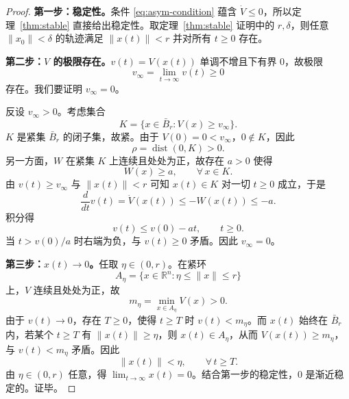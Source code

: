 \documentclass[11pt, a4paper, UTF8, fontset=none]{ctexart}
\theoremstyle{cnthm}
\newcommand{\R}{\mathbb{R}}
\newcommand{\norm}[1]{\lVert #1\rVert}
\DeclareMathOperator{\dist}{dist}
\begin{document}
\begin{proof}
\textbf{第一步：稳定性。}条件 \eqref{eq:asym-condition} 蕴含 $\dot V\le0$，所以定理~\ref{thm:stable} 直接给出稳定性。取定理~\ref{thm:stable} 证明中的 $r,\delta$，则任意 $\norm{x_0}<\delta$ 的轨迹满足 $\norm{x(t)}<r$ 并对所有 $t\ge0$ 存在。

\textbf{第二步：$V$ 的极限存在。}$v(t)=V(x(t))$ 单调不增且下有界 $0$，故极限
\begin{equation}
  v_\infty=\lim_{t\to\infty}v(t)\ge0
\end{equation}
存在。我们要证明 $v_\infty=0$。

反设 $v_\infty>0$。考虑集合
\begin{equation}
  K=\{x\in\bar B_r: V(x)\ge v_\infty\}.
\end{equation}
$K$ 是紧集 $\bar B_r$ 的闭子集，故紧。由于 $V(0)=0<v_\infty$，$0\notin K$，因此
\begin{equation}
  \rho=\dist(0,K)>0.
\end{equation}
另一方面，$W$ 在紧集 $K$ 上连续且处处为正，故存在 $a>0$ 使得
\begin{equation}
  W(x)\ge a,\qquad \forall\,x\in K.
\end{equation}
由 $v(t)\ge v_\infty$ 与 $\norm{x(t)}<r$ 可知 $x(t)\in K$ 对一切 $t\ge0$ 成立，于是
\begin{equation}
  \frac{d}{dt}v(t)=\dot V(x(t))\le -W(x(t))\le -a.
\end{equation}
积分得
\begin{equation}
  v(t)\le v(0)-at,\qquad t\ge0.
\end{equation}
当 $t>v(0)/a$ 时右端为负，与 $v(t)\ge0$ 矛盾。因此 $v_\infty=0$。

\textbf{第三步：$x(t)\to0$。}任取 $\eta\in(0,r)$。在紧环
\begin{equation}
  A_\eta=\{x\in\R^n:\eta\le\norm{x}\le r\}
\end{equation}
上，$V$ 连续且处处为正，故
\begin{equation}
  m_\eta=\min_{x\in A_\eta}V(x)>0.
\end{equation}
由于 $v(t)\to0$，存在 $T\ge0$，使得 $t\ge T$ 时 $v(t)<m_\eta$。而 $x(t)$ 始终在 $\bar B_r$ 内，若某个 $t\ge T$ 有 $\norm{x(t)}\ge\eta$，则 $x(t)\in A_\eta$，从而 $V(x(t))\ge m_\eta$，与 $v(t)<m_\eta$ 矛盾。因此
\begin{equation}
  \norm{x(t)}<\eta,\qquad \forall\,t\ge T.
\end{equation}
由 $\eta\in(0,r)$ 任意，得 $\lim_{t\to\infty}x(t)=0$。结合第一步的稳定性，$0$ 是渐近稳定的。证毕。
\end{proof}
\end{document}

